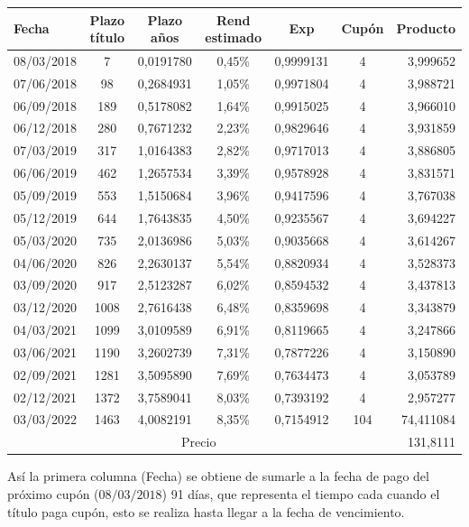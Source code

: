 \begin{center}
{\begin{tabular}[t]{|l |c |c |c |c |c |r|}
\hline
Fecha & Plazo t\'itulo & Plazo a\~nos & Rend estimado & Exp & Cup\'on & Producto \\
\hline
08/03/2018 & 7  & 0,0191780 & 0,45\% & 0,9999131 & 4& 3,999652\\
\hline
07/06/2018 & 98 & 0,2684931 & 1,05\% & 0,9971804 & 4& 3,988721\\
\hline
06/09/2018 & 189 & 0,5178082 & 1,64\% & 0,9915025 & 4& 3,966010\\
\hline
06/12/2018 & 280 & 0,7671232 & 2,23\% & 0,9829646 & 4& 3,931859\\
\hline
07/03/2019 & 317 & 1,0164383 & 2,82\% & 0,9717013 & 4& 3,886805\\
\hline
06/06/2019 & 462 & 1,2657534 & 3,39\% & 0,9578928 & 4& 3,831571\\
\hline
05/09/2019 & 553 & 1,5150684 & 3,96\% & 0,9417596 & 4& 3,767038\\
\hline
05/12/2019 & 644 & 1,7643835 & 4,50\% & 0,9235567 & 4& 3,694227\\
\hline
05/03/2020 & 735 & 2,0136986 & 5,03\% & 0,9035668 & 4& 3,614267\\
\hline
04/06/2020 & 826 & 2,2630137 & 5,54\% & 0,8820934 & 4& 3,528373\\
\hline
03/09/2020 & 917 & 2,5123287 & 6,02\% & 0,8594532 & 4& 3,437813\\
\hline
03/12/2020 & 1008 & 2,7616438 & 6,48\% & 0,8359698 & 4& 3,343879\\
\hline
04/03/2021 & 1099 & 3,0109589 & 6,91\% & 0,8119665 & 4& 3,247866\\
\hline
03/06/2021 & 1190 & 3,2602739 & 7,31\% & 0,7877226 & 4& 3,150890\\
\hline
02/09/2021 & 1281 & 3,5095890 & 7,69\% & 0,7634473 & 4& 3,053789\\
\hline
02/12/2021 & 1372 & 3,7589041 & 8,03\% & 0,7393192 & 4& 2,957277\\
\hline
03/03/2022 & 1463 & 4,0082191 & 8,35\% & 0,7154912 & 104 & 74,411084\\
\hline
\multicolumn{6}{|c|}{Precio} & 131,8111 \\
\hline
\end{tabular}
}
\end{center}

\hspace{0.4cm}As\'i la primera columna (Fecha) se obtiene de sumarle a la fecha de pago del pr\'oximo cup\'on ($08/03/2018$) 91 d\'ias, que representa el tiempo cada cuando el t\'itulo paga cup\'on, esto se realiza  hasta llegar a la fecha de vencimiento.

